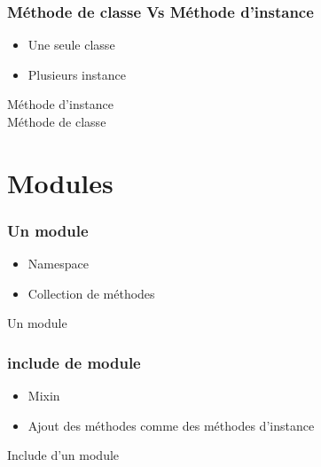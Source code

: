 \documentclass{beamer}
\begin{document}
\begin{frame}
  \frametitle{M\'ethode de classe Vs M\'ethode d'instance}
  \begin{itemize}
    \item Une seule classe
    \item Plusieurs instance
  \end{itemize}
\end{frame}

\begin{frame}
  \begin{beamerboxesrounded}{M\'ethode d'instance \\ M\'ethode de classe}
    
  \end{beamerboxesrounded}
\end{frame}

\section{Modules}

\begin{frame}
  \frametitle{Un module}
  \begin{itemize}
    \item Namespace
    \item Collection de m\'ethodes
  \end{itemize}
\end{frame}

\begin{frame}
  \begin{beamerboxesrounded}{Un module}
    
  \end{beamerboxesrounded}
\end{frame}

\begin{frame}
  \frametitle{include de module}
  \begin{itemize}
    \item Mixin
    \item Ajout des m\'ethodes comme des m\'ethodes d'instance
  \end{itemize}
\end{frame}

\begin{frame}
  \begin{beamerboxesrounded}{Include d'un module}
    
  \end{beamerboxesrounded}
\end{frame}
\end{document}
